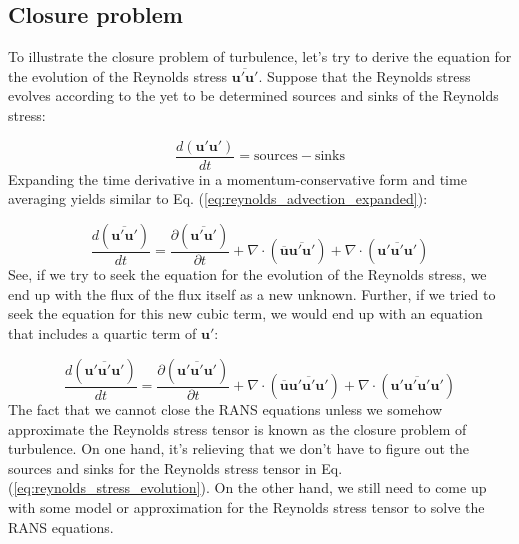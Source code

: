 \documentclass[12pt]{article}
\numberwithin{equation}{section}
\numberwithin{figure}{section}
\numberwithin{table}{section}
\begin{document}
\subsection{Closure problem}

To illustrate the closure problem of turbulence, let's try to derive the
equation for the evolution of the Reynolds stress $\overline{\mathbf{u}' \mathbf{u}'}$.
Suppose that the Reynolds stress evolves according to the yet to be determined
sources and sinks of the Reynolds stress:

\begin{equation}
  \frac{d \left( \mathbf{u}' \mathbf{u}' \right)}{dt} =
  \text{sources} - \text{sinks}
  \label{eq:reynolds_stress_evolution}
\end{equation}
Expanding the time derivative in a momentum-conservative form and time averaging
yields similar to Eq. (\ref{eq:reynolds_advection_expanded}):

\begin{equation}
  \frac{d \left( \overline{\mathbf{u}' \mathbf{u}'} \right)}{dt} =
  \frac{\partial \left( \overline{\mathbf{u}' \mathbf{u}'} \right)}{\partial t} +
  \nabla \cdot \left( \overline{\mathbf{u}} \overline{\mathbf{u}' \mathbf{u}'} \right) +
  \nabla \cdot \left( \overline{\mathbf{u}' \mathbf{u}' \mathbf{u}'} \right)
\end{equation}
See, if we try to seek the equation for the evolution of the Reynolds stress,
we end up with the flux of the flux itself as a new unknown.
Further, if we tried to seek the equation for this new cubic term, we would
end up with an equation that includes a quartic term of $\mathbf{u}'$:


\begin{equation}
  \frac{d \left( \overline{\mathbf{u}' \mathbf{u}' \mathbf{u}'} \right)}{dt} =
  \frac{\partial \left( \overline{\mathbf{u}' \mathbf{u}' \mathbf{u}'} \right)}{\partial t} +
  \nabla \cdot \left( \overline{\mathbf{u}} \overline{\mathbf{u}' \mathbf{u}' \mathbf{u}'} \right) +
  \nabla \cdot \left( \overline{\mathbf{u}' \mathbf{u}' \mathbf{u}' \mathbf{u}'} \right)
\end{equation}
The fact that we cannot close the RANS equations unless we somehow approximate
the Reynolds stress tensor is known as the closure problem of turbulence.
On one hand, it's relieving that we don't have to figure out the sources and
sinks for the Reynolds stress tensor in Eq. (\ref{eq:reynolds_stress_evolution}).
On the other hand, we still need to come up with some model or approximation
for the Reynolds stress tensor to solve the RANS equations.
\end{document}
